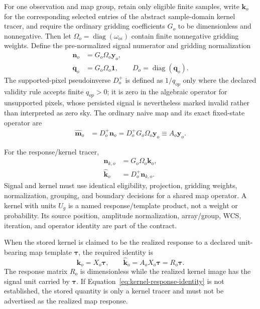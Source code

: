 \documentclass[11pt]{article}
\newcommand{\diag}{\operatorname{diag}}
\begin{document}
For one observation and map group, retain only eligible finite samples, write
\(\boldsymbol k_o\) for the corresponding selected entries of the abstract
sample-domain kernel tracer, and require the ordinary gridding coefficients
\(G_o\) to be dimensionless and nonnegative. Then
let \(\Omega_o=\diag(\omega_{oi})\) contain finite nonnegative gridding
weights. Define the pre-normalized signal numerator and gridding normalization
\begin{align}
  \boldsymbol n_o &= G_o\Omega_o\boldsymbol y_o,
  \label{eq:naive-numerator}\\
  \boldsymbol q_o &= G_o\Omega_o\boldsymbol 1,
  \qquad D_o=\diag(\boldsymbol q_o).
  \label{eq:naive-denominator}
\end{align}
The supported-pixel pseudoinverse \(D_o^{+}\) is defined as \(1/q_{op}\) only
where the declared validity rule accepts finite \(q_{op}>0\); it is zero in
the algebraic operator for unsupported pixels, whose persisted signal is
nevertheless marked invalid rather than interpreted as zero sky. The ordinary
naive map and its exact fixed-state operator are
\begin{align}
  \widehat{\boldsymbol m}_o
    &=D_o^{+}\boldsymbol n_o
      =D_o^{+}G_o\Omega_o\boldsymbol y_o
      \equiv A_o\boldsymbol y_o.
  \label{eq:naive-map}
\end{align}

For the response/kernel tracer,
\begin{align}
  \boldsymbol n_{k,o} &= G_o\Omega_o\boldsymbol k_o,
  \label{eq:kernel-numerator}\\
  \widehat{\boldsymbol k}_{o} &=D_o^{+}\boldsymbol n_{k,o}.
  \label{eq:normalized-kernel}
\end{align}
Signal and kernel must use identical eligibility, projection, gridding weights,
normalization, grouping, and boundary decisions for a shared map operator. A
kernel with units \(U_g\) is a named response/template product, not a weight or
probability. Its source position, amplitude normalization, array/group, WCS,
iteration, and operator identity are part of the contract.

When the stored kernel is claimed to be the realized response to a declared
unit-bearing map template \(\boldsymbol\tau\), the required identity is
\begin{equation}
 \boldsymbol k_o=X_o\boldsymbol\tau,
 \qquad
 \widehat{\boldsymbol k}_o
 =A_oX_o\boldsymbol\tau
 =R_o\boldsymbol\tau.
 \label{eq:kernel-response-identity}
\end{equation}
The response matrix \(R_o\) is dimensionless while the realized kernel image
has the signal unit carried by \(\boldsymbol\tau\). If
Equation~\eqref{eq:kernel-response-identity} is not established, the stored
quantity is only a kernel tracer and must not be advertised as the realized
map response.
\end{document}
